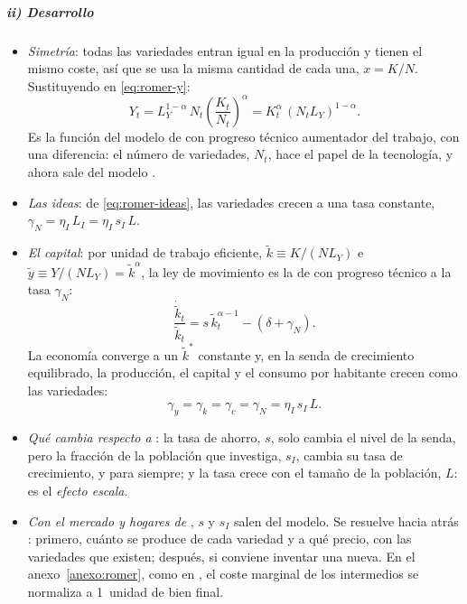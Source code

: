 \documentclass[11pt]{article}
\begin{document}
\begin{infografia}[H]
\centering
\caption{Los 3~sectores del modelo de  (1990)}\label{figu:romer-sectores}
\end{infografia}

\subparagraph{ii) Desarrollo}

\begin{itemize}
\item \emph{Simetría}: todas las variedades entran igual en la producción y tienen el mismo coste, así que se usa la misma cantidad de cada una, $x=K/N$. Sustituyendo en \eqref{eq:romer-y}:
  \[Y_t=L_Y^{1-\alpha}\,N_t\left(\frac{K_t}{N_t}\right)^{\alpha}=K_t^{\alpha}\,(N_tL_Y)^{1-\alpha}.\]
  Es la función del modelo de  con progreso técnico aumentador del trabajo, con una diferencia: el número de variedades, $N_t$, hace el papel de la tecnología, y ahora sale del modelo .
\item \emph{Las ideas}: de \eqref{eq:romer-ideas}, las variedades crecen a una tasa constante, $\gamma_N=\eta_I\,L_I=\eta_I\,s_I\,L$.
\item \emph{El capital}: por unidad de trabajo eficiente, $\tilde k\equiv K/(NL_Y)$ e $\tilde y\equiv Y/(NL_Y)=\tilde k^{\alpha}$, la ley de movimiento es la de  con progreso técnico a la tasa $\gamma_N$:
  \[\frac{\dot{\tilde k}_t}{\tilde k_t}=s\,\tilde k_t^{\alpha-1}-(\delta+\gamma_N).\]
  La economía converge a un $\tilde k^*$ constante y, en la senda de crecimiento equilibrado, la producción, el capital y el consumo por habitante crecen como las variedades:
  \begin{equation}
  \gamma_y=\gamma_k=\gamma_c=\gamma_N=\eta_I\,s_I\,L.\label{eq:romer-solow}
  \end{equation}
\item \emph{Qué cambia respecto a }: la tasa de ahorro, $s$, solo cambia el nivel de la senda, pero la fracción de la población que investiga, $s_I$, cambia su tasa de crecimiento, y para siempre; y la tasa crece con el tamaño de la población, $L$: es el \emph{efecto escala}.
\item \emph{Con el mercado y hogares de }, $s$ y $s_I$ salen del modelo. Se resuelve hacia atrás : primero, cuánto se produce de cada variedad y a qué precio, con las variedades que existen; después, si conviene inventar una nueva. En el anexo~\ref{anexo:romer}, como en \textcite[cap.~6]{BarroSalaiMartin2004}, el coste marginal de los intermedios se normaliza a 1~unidad de bien final.

\end{itemize}
\end{document}
